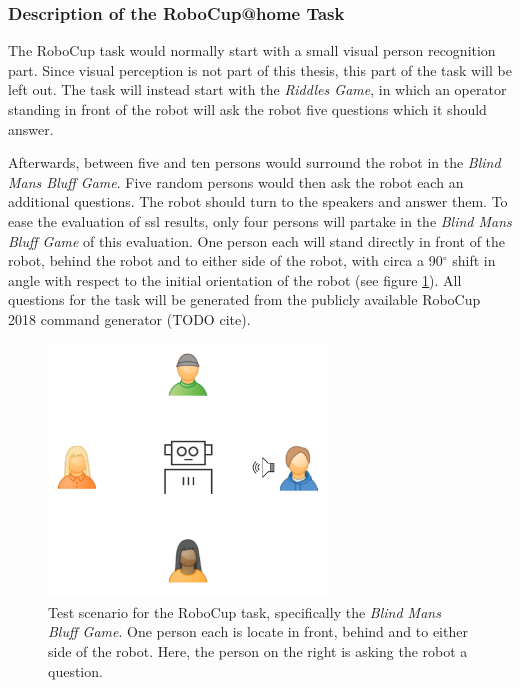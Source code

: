 \subsubsection{Description of the RoboCup@home Task}
The RoboCup task would normally start with a small visual person recognition part.
Since visual perception is not part of this thesis, this part of the task will be left out.
The task will instead start with the \textit{Riddles Game}, in which an operator standing in front of the robot will ask the robot five questions which it should answer.

Afterwards, between five and ten persons would surround the robot in the \textit{Blind Mans Bluff Game}.
Five random persons would then ask the robot each an additional questions.
The robot should turn to the speakers and answer them.
To ease the evaluation of \gls{ssl} results, only four persons will partake in the \textit{Blind Mans Bluff Game} of this evaluation.
One person each will stand directly in front of the robot, behind the robot and to either side of the robot, with circa a 90$^\circ$ shift in angle with respect to the initial orientation of the robot (see figure \ref{pic:eval_task}).
All questions for the task will be generated from the publicly available RoboCup 2018 command generator (TODO cite).

\begin{figure}[]
	\centering
	\includegraphics[width=0.66\textwidth]{diagrams/robocup_task_t1.pdf}
	\caption{Test scenario for the RoboCup task, specifically the \textit{Blind Mans Bluff Game}. 
		One person each is locate in front, behind and to either side of the robot.
		Here, the person on the right is asking the robot a question.}
	\label{pic:eval_task}
\end{figure}

